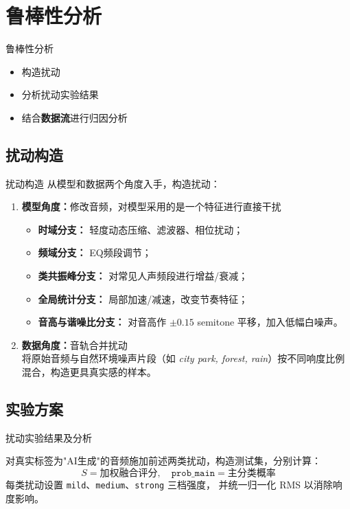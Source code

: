 \documentclass[aspectratio=169]{beamer}
\begin{document}
\section{鲁棒性分析}
\begin{frame}{鲁棒性分析}
  \begin{itemize}
    \item 构造扰动
    \item 分析扰动实验结果
    \item 结合\textbf{数据流}进行归因分析
  \end{itemize}
\end{frame}

\subsection{扰动构造}
\begin{frame}{扰动构造}
从模型和数据两个角度入手，构造扰动：
\begin{enumerate}
\item \textbf{模型角度：}修改音频，对模型采用的是一个特征进行直接干扰
  \begin{itemize}
    \item \textbf{时域分支：} 轻度动态压缩、滤波器、相位扰动；
    \item \textbf{频域分支：} EQ频段调节；
    \item \textbf{类共振峰分支：} 对常见人声频段进行增益/衰减；
    \item \textbf{全局统计分支：} 局部加速/减速，改变节奏特征；
    \item \textbf{音高与谐噪比分支：} 对音高作 $\pm 0.15$ semitone 平移，加入低幅白噪声。
  \end{itemize}

\item \textbf{数据角度：}音轨合并扰动\\
  将原始音频与自然环境噪声片段（如 \emph{city park, forest, rain}）按不同响度比例混合，构造更具真实感的样本。
\end{enumerate}

\end{frame}

\subsection{实验方案}
\begin{frame}{扰动实验结果及分析}

对真实标签为"AI生成"的音频施加前述两类扰动，构造测试集，分别计算：
\[
S = \text{加权融合评分}, \quad \texttt{prob\_main} = \text{主分类概率}
\]
  每类扰动设置 \texttt{mild}、\texttt{medium}、\texttt{strong} 三档强度，
  并统一归一化 RMS 以消除响度影响。
\end{frame}
\end{document}

